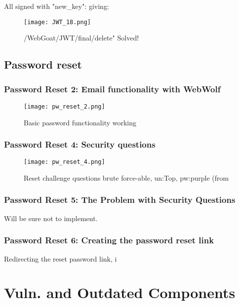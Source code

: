 \documentclass[
	letterpaper, %
	10pt, %
	unnumberedsections, %
	twoside, %
]{APAAssignment}
\begin{document}
\begin{appendices}
All signed with "new\_key": giving:

\begin{figure}[!ht] %
	\centering
	\texttt{[image: JWT\_18.png]}
	\caption{/WebGoat/JWT/final/delete" Solved!}
	\label{fig:app:JWT18}
\end{figure}

\subsection{Password reset}

\subsubsection{Password Reset 2: Email functionality with WebWolf}

\begin{figure}[!ht] %
	\centering
	\texttt{[image: pw\_reset\_2.png]}
	\caption{Basic password functionality working}
	\label{fig:app:pw_reset_2}
\end{figure}

\subsubsection{Password Reset 4: Security questions}

\begin{figure}[!ht] %
	\centering
	\texttt{[image: pw\_reset\_4.png]}
	\caption{Reset challenge questions brute force-able, un:Top, pw:purple (from \cite{CycubicsDocsWebGoat}}
	\label{fig:app:pw_reset_4}
\end{figure}

\subsubsection{Password Reset 5: The Problem with Security Questions}
Will be sure not to implement.


\subsubsection{Password Reset 6: Creating the password reset link}
Redirecting the reset password link, i  





\section{Vuln. and Outdated Components}\label{app:VulnAndOutdatedComponents}

\end{appendices}
\end{document}
